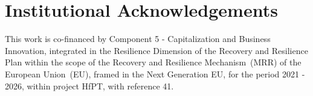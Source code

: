 \section*{Institutional Acknowledgements}

This work is co-financed by Component 5 - Capitalization and Business Innovation, integrated in the Resilience Dimension of the Recovery and Resilience Plan within the scope of the Recovery and Resilience Mechanism~(MRR) of the European Union~(EU), framed in the Next Generation EU, for the period 2021 - 2026, within project HfPT, with reference 41.